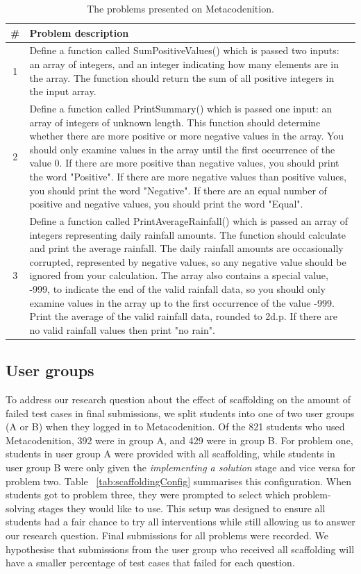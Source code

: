 \documentclass[sigconf,authorversion,nonacm]{acmart}
\begin{document}
\begin{table}
  \caption{The problems presented on Metacodenition.}
  \label{tab:problems}
  \begin{tabular}{c|p{75mm}}
    \toprule
    \#&Problem description\\
    \midrule
    1 & Define a function called SumPositiveValues() which is passed two inputs: an array of integers, and an integer indicating how many elements are in the array. The function should return the sum of all positive integers in the input array.\\
    \midrule
    2 & Define a function called PrintSummary() which is passed one input: an array of integers of unknown length. This function should determine whether there are more positive or more negative values in the array. You should only examine values in the array until the first occurrence of the value 0. If there are more positive than negative values, you should print the word "Positive". If there are more negative values than positive values, you should print the word "Negative". If there are an equal number of positive and negative values, you should print the word "Equal".\\
    \midrule
    3 & Define a function called PrintAverageRainfall() which is passed an array of integers representing daily rainfall amounts. The function should calculate and print the average rainfall. The daily rainfall amounts are occasionally corrupted, represented by negative values, so any negative value should be ignored from your calculation. The array also contains a special value, -999, to indicate the end of the valid rainfall data, so you should only examine values in the array up to the first occurrence of the value -999. Print the average of the valid rainfall data, rounded to 2d.p. If there are no valid rainfall values then print "no rain". \\
  \bottomrule
\end{tabular}
\end{table}

\subsection{User groups}
To address our research question about the effect of scaffolding on the amount of failed test cases in final submissions, we split students into one of two user groups (A or B) when they logged in to Metacodenition. Of the 821 students who used Metacodenition, 392 were in group A, and 429 were in group B. For problem one, students in user group A were provided with all scaffolding, while students in user group B were only given the \emph{implementing a solution} stage and vice versa for problem two. Table ~\ref{tab:scaffoldingConfig} summarises this configuration. When students got to problem three, they were prompted to select which problem-solving stages they would like to use. This setup was designed to ensure all students had a fair chance to try all interventions while still allowing us to answer our research question. Final submissions for all problems were recorded. We hypothesise that submissions from the user group who received all scaffolding will have a smaller percentage of test cases that failed for each question.
\end{document}
